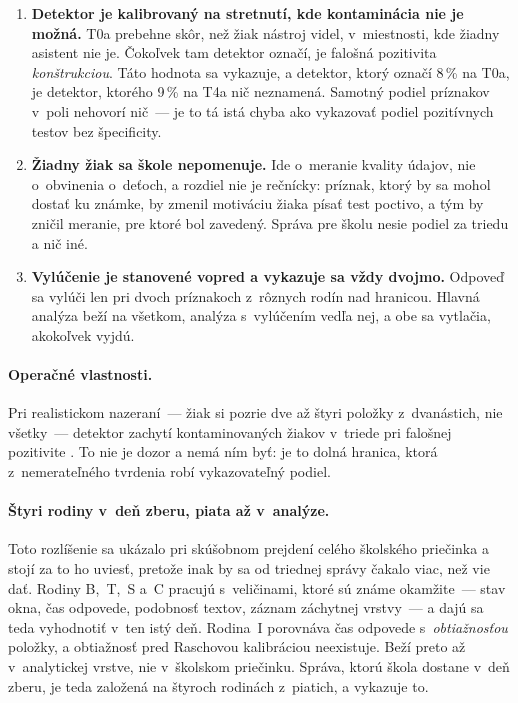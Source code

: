 \begin{enumerate}[nosep]
    \item \textbf{Detektor je kalibrovaný na stretnutí, kde kontaminácia nie je
          možná.} T0a prebehne skôr, než žiak nástroj videl, v~miestnosti, kde
          žiadny asistent nie je. Čokoľvek tam detektor označí, je falošná
          pozitivita \emph{konštrukciou}. Táto hodnota sa vykazuje, a detektor,
          ktorý označí 8\,\% na T0a, je detektor, ktorého 9\,\% na T4a nič
          neznamená. Samotný podiel príznakov v~poli nehovorí nič~--- je to tá
          istá chyba ako vykazovať podiel pozitívnych testov bez špecificity.
    \item \textbf{Žiadny žiak sa škole nepomenuje.} Ide o~meranie kvality údajov,
          nie o~obvinenia o~deťoch, a rozdiel nie je rečnícky: príznak, ktorý by
          sa mohol dostať ku známke, by zmenil motiváciu žiaka písať test
          poctivo, a tým by zničil meranie, pre ktoré bol zavedený. Správa pre
          školu nesie podiel za triedu a nič iné.
    \item \textbf{Vylúčenie je stanovené vopred a vykazuje sa vždy dvojmo.}
          Odpoveď sa vylúči len pri dvoch príznakoch z~rôznych rodín nad hranicou.
          Hlavná analýza beží na všetkom, analýza s~vylúčením vedľa nej, a obe sa
          vytlačia, akokoľvek vyjdú.
\end{enumerate}

\paragraph{Operačné vlastnosti.} Pri realistickom nazeraní~--- žiak si pozrie dve
až štyri položky z~dvanástich, nie všetky~--- detektor zachytí
\asmIntegDetect{} kontaminovaných žiakov v~triede
pri falošnej pozitivite \asmIntegFalsePos{}. To nie je dozor a nemá ním byť: je to
dolná hranica, ktorá z~nemerateľného tvrdenia robí vykazovateľný podiel.

\paragraph{Štyri rodiny v~deň zberu, piata až v~analýze.} Toto rozlíšenie sa
ukázalo pri skúšobnom prejdení celého školského priečinka a stojí za to ho
uviesť, pretože inak by sa od triednej správy čakalo viac, než vie dať. Rodiny
B,~T,~S a~C pracujú s~veličinami, ktoré sú známe okamžite~--- stav okna, čas
odpovede, podobnosť textov, záznam záchytnej vrstvy~--- a dajú sa teda vyhodnotiť
v~ten istý deň. Rodina~I porovnáva čas odpovede s~\emph{obtiažnosťou} položky, a
obtiažnosť pred Raschovou kalibráciou neexistuje. Beží preto až v~analytickej
vrstve, nie v~školskom priečinku. Správa, ktorú škola dostane v~deň zberu, je
teda založená na štyroch rodinách z~piatich, a vykazuje to.


